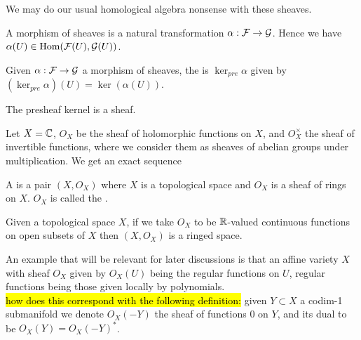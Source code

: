 \documentclass{article}
\begin{document}
We may do our usual homological algebra nonsense with these sheaves. 

\begin{definition}
	A morphism of sheaves is a natural transformation $\alpha : \mathcal{F} \to \mathcal{G}$. Hence we have $\alpha(U) \in \operatorname{Hom}(\mathcal{F}(U),\mathcal{G}(U))$.
\end{definition}

\begin{definition}
	Given $\alpha: \mathcal{F} \to \mathcal{G}$ a morphism of sheaves, the  is $\ker_{pre}\alpha$ given by $(\ker_{pre}\alpha)(U) = \ker (\alpha(U))$.  
\end{definition}

\begin{prop}
	The presheaf kernel is a sheaf. 
\end{prop}

\begin{example}
	Let $X=\mathbb{C}$, $O_X$ be the sheaf of holomorphic functions on $X$, and $O_X^\times$ the sheaf of invertible functions, where we consider them as sheaves of abelian groups under multiplication. We get an exact sequence 
\end{example}

\begin{definition}
	A  is a pair $(X,O_X)$ where $X$ is a topological space and $O_X$ is a sheaf of rings on $X$. $O_X$ is called the . 
\end{definition}

\begin{example}
	Given a topological space $X$, if we take $O_X$ to be $\mathbb{R}$-valued continuous functions on open subsets of $X$ then $(X,O_X)$ is a ringed space. 
\end{example}

\begin{example}
	An example that will be relevant for later discussions is that an affine variety $X$ with sheaf $O_X$ given by $O_X(U)$ being the regular functions on $U$, regular functions being those given locally by polynomials. \\
	\hl{how does this correspond with the following definition:} given $Y \subset X$ a codim-1 submanifold we denote $O_X(-Y)$ the sheaf of functions 0 on $Y$, and its dual to be $O_X(Y) = O_X(-Y)^\ast$. 
\end{example}

\end{document}
